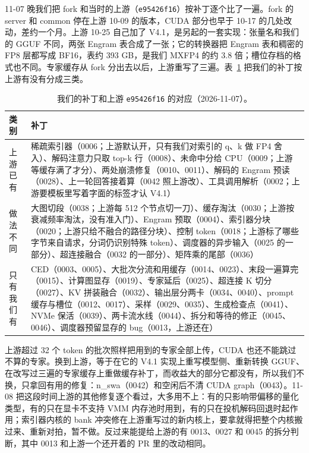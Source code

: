 \documentclass[11pt,a4paper]{article}
\newcommand{\code}[1]{\texttt{#1}}
\begin{document}
11-07 晚我们把 fork 和当时的上游（\code{e95426f16}）按补丁逐个比了一遍。fork 的 server 和 common 停在上游 10-09 的版本，CUDA 部分也早于 10-17 的几处改动，差约一个月。上游 10-25 自己加了 V4.1，是另起的一套实现：张量名和我们的 GGUF 不同，两张 Engram 表合成了一张；它的转换器把 Engram 表和稠密的 FP8 层都写成 BF16，表约 393 GB，是我们 MXFP4 的约 3.8 倍；槽位存档的格式也不同。专家缓存从 fork 分出去以后，上游重写了三遍。表~\ref{tab:upstreamcode} 把我们的补丁按上游有没有分成三类。

\begin{table}[h]
  \centering
  \small
  \caption{我们的补丁和上游 \code{e95426f16} 的对应（2026-11-07）。}
  \label{tab:upstreamcode}
  \begin{tabularx}{\textwidth}{@{}>{\raggedright\arraybackslash}p{2.6cm} X@{}}
    \toprule
    类别 & 补丁 \\
    \midrule
    上游已有 & 稀疏索引器（0006；上游默认开，只有我们对索引的 q、k 做 FP4 舍入）、解码注意力只取 top-k 行（0008）、未命中分给 CPU（0009；上游等缓存满了才分）、两处崩溃修复（0010、0011）、解码的 Engram 预读（0028）、上一轮回答接着算（0042 照上游改）、工具调用解析（0002；上游要模板里写着字面的标签才认 V4.1） \\
    做法不同 & 大图切段（0038；上游每 512 个节点切一刀）、缓存淘汰（0030；上游按衰减频率淘汰，没有准入门）、Engram 预取（0004）、索引器分块（0020；上游只给不融合的路径分块）、控制 token（0018；上游标了哪些字节来自请求，分词仍识别特殊 token）、调度器的异步输入（0025 的一部分）、超连接融合（0032 的一部分）、矩阵乘的尾部（0036） \\
    只有我们有 & CED（0003、0005）、大批次分流和用缓存（0014、0023）、末段一遍算完（0015）、计算图显存（0019）、专家延后（0025）、超连接 K 切分（0027）、KV 拼装融合（0032）、输出层分两卡（0034、0040）、prompt 缓存与槽位（0012、0017）、采样（0029、0035）、生成检查点（0041）、NVMe 保活（0039）、两卡流水线（0044）、拆分和等待的修正（0045、0046）、调度器预留显存的 bug（0013，上游还在） \\
    \bottomrule
  \end{tabularx}
\end{table}

上游超过 32 个 token 的批次照样把用到的专家全部上传，CUDA 也还不能跳过不算的专家。换到上游，等于在它的 V4.1 实现上重写模型侧、重新转换 GGUF、在改写过三遍的专家缓存上重做缓存补丁，而收益大的部分它都没有，所以我们不换，只拿回有用的修复：n\_swa（0042）和空闲后不清 CUDA graph（0043）。11-08 把这段时间上游的其他修复逐个看过，大多用不上：有的只影响带偏移的量化类型，有的只在显卡不支持 VMM 内存池时用到，有的只在投机解码回退时起作用；索引器内核的 bank 冲突修在上游重写过的新内核上，要拿就得把整个内核搬过来、重新对拍，暂不做。反过来能提给上游的有 0013、0027 和 0045 的拆分判断，其中 0013 和上游一个还开着的 PR 里的改动相同。
\end{document}
